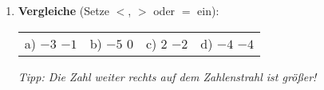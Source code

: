 \begin{enumerate}[resume, label=\arabic*.]
    \vspace{0.8cm}

    \item \textbf{Vergleiche} (Setze $<$, $>$ oder $=$ ein):

    \vspace{0.3cm}
    \begin{tabular}{llll}
        a) $-3$ \underline{\hspace{1cm}} $-1$ & 
        b) $-5$ \underline{\hspace{1cm}} $0$ & 
        c) $2$ \underline{\hspace{1cm}} $-2$ & 
        d) $-4$ \underline{\hspace{1cm}} $-4$
    \end{tabular}

    \textit{Tipp: Die Zahl weiter rechts auf dem Zahlenstrahl ist größer!}
\end{enumerate}
